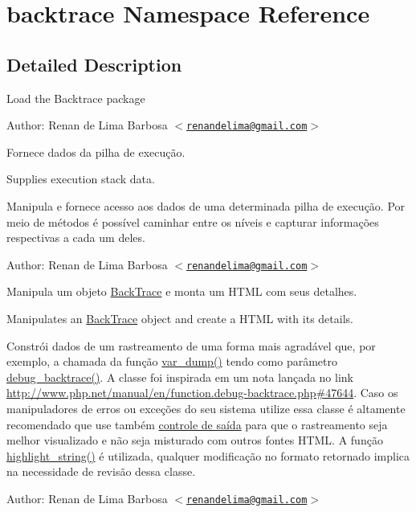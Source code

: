 \hypertarget{namespacebacktrace}{
\section{backtrace Namespace Reference}
\label{namespacebacktrace}
}


\subsection{Detailed Description}
Load the Backtrace package

\begin{Desc}
\item[Author:]Renan de Lima Barbosa $<$\href{mailto:renandelima@gmail.com}{\tt renandelima@gmail.com}$>$\end{Desc}
Fornece dados da pilha de execução.

Supplies execution stack data.

Manipula e fornece acesso aos dados de uma determinada pilha de execução. Por meio de métodos é possível caminhar entre os níveis e capturar informações respectivas a cada um deles.

\begin{Desc}
\item[Author:]Renan de Lima Barbosa $<$\href{mailto:renandelima@gmail.com}{\tt renandelima@gmail.com}$>$\end{Desc}
Manipula um objeto \hyperlink{class_back_trace}{BackTrace} e monta um HTML com seus detalhes.

Manipulates an \hyperlink{class_back_trace}{BackTrace} object and create a HTML with its details.

Constrói dados de um rastreamento de uma forma mais agradável que, por exemplo, a chamada da função \hyperlink{}{var\_\-dump()} tendo como parâmetro \hyperlink{}{debug\_\-backtrace()}. A classe foi inspirada em um nota lançada no link \hyperlink{}{http://www.php.net/manual/en/function.debug-backtrace.php\#47644}. Caso os manipuladores de erros ou exceções do seu sistema utilize essa classe é altamente recomendado que use também \hyperlink{}{controle de saída} para que o rastreamento seja melhor visualizado e não seja misturado com outros fontes HTML. A função \hyperlink{}{highlight\_\-string()} é utilizada, qualquer modificação no formato retornado implica na necessidade de revisão dessa classe.

\begin{Desc}
\item[Author:]Renan de Lima Barbosa $<$\href{mailto:renandelima@gmail.com}{\tt renandelima@gmail.com}$>$ \end{Desc}


